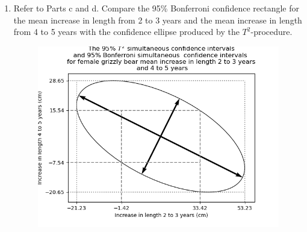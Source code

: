 \begin{enumerate}[label=(\alph*)]
    \item Refer to Parts c and d. Compare the 95\% Bonferroni confidence rectangle for the mean increase in length from 2 to 3 years and the mean increase in length from 4 to 5 years with the confidence ellipse produced by the $T^{2}$-procedure.
    
    \begin{figure}[H]
        \centering
            \includegraphics[scale=0.75]{./python/chapter-5/Question-5-10-e.png}
    \end{figure}
\end{enumerate}